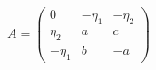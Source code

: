 \begin{equation}
A=\left(\begin{array}{ccc}
0&-\eta_1&-\eta_2\\
\eta_2&a&c\\
-\eta_1&b&-a
\end{array}\right)
\end{equation}

